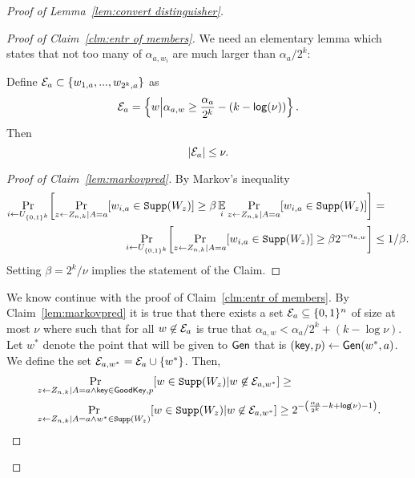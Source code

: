 \begin{proof}[Proof of Lemma~\ref{lem:convert distinguisher}]
\begin{proof}[Proof of Claim~\ref{clm:entr of members}]
\noindent
We need an elementary lemma which states that not too many of $\alpha_{a, w_i}$ are much larger than $\alpha_a/2^k$:
\begin{claim}
    \label{lem:markovpred} %
    Define $\mathcal{E}_a \subset \{w_{1,a},..., w_{2^k, a}\}$ as \[\mathcal{E}_a =\left\{w \middle| \alpha_{a,w} \ge \frac{\alpha_{a}}{2^k} -(k-\mathsf{log}\!\left(\nu\right))\right\}.\] %
    Then 
    \[
    \left|\mathcal{E}_a\right|\le \nu.
    \]
\end{claim}
\begin{proof}[Proof of Claim~\ref{lem:markovpred}]
By Markov's inequality
\begin{align*}
    \Pr\limits_{i\leftarrow U_{\{0, 1\}^k}}\!\left[\Pr_{z\leftarrow Z_{n,k} | A=a}[w_{i,a}\in \mathtt{Supp}(W_z)] \ge \beta \operatorname*{\mathbb{E}}_i  \Pr_{z\leftarrow Z_{n,k} | A=a}[w_{i,a}\in \mathtt{Supp}(W_z)]\right]&=\\
        \Pr\limits_{i\leftarrow U_{\{0, 1\}^k}}\!\left[\Pr_{z\leftarrow Z_{n,k} | A=a}[w_{i,a}\in \mathtt{Supp}(W_z)] \ge \beta 2^{-\alpha_{a,w}}\right]
    &\le 1/\beta.
    \end{align*}
    Setting $\beta = 2^k/\nu$ implies the statement of the Claim.
%
\end{proof}
\noindent
We know continue with the proof of Claim~\ref{clm:entr of members}. By Claim~\ref{lem:markovpred} it is true that there exists a set $\mathcal{E}_a\subseteq \{0, 1\}^n$ of size at most  $\nu$ where  such that for all $w\not \in \mathcal{E}_a$ is true that $\alpha_{a, w}< \alpha_a/2^k+(k-\log{\nu}).$
Let $w^*$ denote the point that will be given to ${\mathsf{Gen}}$ that is $(\mathsf{key}, p)\leftarrow {\ensuremath{\mathsf{Gen}}}(w^*, a)$.  We define the set $\mathcal{E}_{a,w^*} = \mathcal{E}_a \cup \{w^*\}$.
Then,
\begin{align*}
&\Pr_{z\leftarrow \znk| A=a \wedge \mathsf{key}\in \goodkey, p}[w\in \supp(W_z) | w\not \in \easy_{a,w^*}] \ge\\
&\Pr_{z\leftarrow \znk| A=a \wedge w^*\in \supp(W_z)}[w\in \supp(W_z) | w\not \in \easy_{a,w^*}]\ge 2^{-\left(\frac{\alpha_a}{2^k}-k+\log{\nu}-1\right)}.

\end{align*}
\end{proof}
\end{proof}
